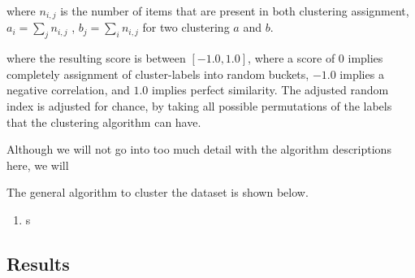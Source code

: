 \documentclass[a4paper,12pt,twoside,openright]{report}
\begin{document}
where $n_{i,j}$ is the number of items that are present in both clustering assignment, $a_i = \sum_j n_{i,j}$ , $b_j = \sum_i n_{i,j}$ for two clustering $a$ and $b$.

where the resulting score is between $[-1.0, 1.0]$, where a score of $0$ implies completely assignment of cluster-labels into random buckets, $-1.0$ implies a negative correlation, and $1.0$ implies perfect similarity.
The adjusted random index is adjusted for chance, by taking all possible permutations of the labels that the clustering algorithm can have.




Although we will not go into too much detail with the algorithm descriptions here, we will 


The general algorithm to cluster the dataset is shown below.



\begin{enumerate}
\item s
\end{enumerate}


\subsection{Results}

\end{document}
